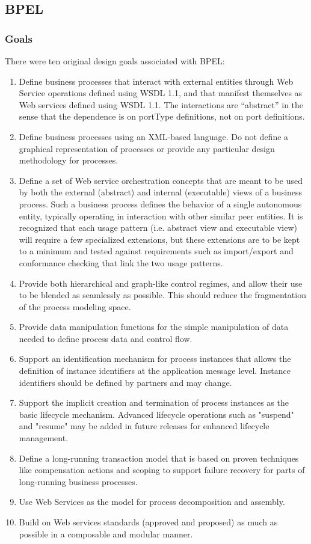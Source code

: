 \documentclass[12pt,a4paper]{article}
\begin{document}
\subsection{BPEL}
\subsubsection{Goals}
There were ten original design goals associated with BPEL:
\begin{enumerate}
\item Define business processes that interact with external entities through Web Service operations defined using WSDL 1.1, and that manifest themselves as Web services defined using WSDL 1.1. The interactions are “abstract” in the sense that the dependence is on portType definitions, not on port definitions.
\item Define business processes using an XML-based language. Do not define a graphical representation of processes or provide any particular design methodology for processes.
\item Define a set of Web service orchestration concepts that are meant to be used by both the external (abstract) and internal (executable) views of a business process. Such a business process defines the behavior of a single autonomous entity, typically operating in interaction with other similar peer entities. It is recognized that each usage pattern (i.e. abstract view and executable view) will require a few specialized extensions, but these extensions are to be kept to a minimum and tested against requirements such as import/export and conformance checking that link the two usage patterns.
\item Provide both hierarchical and graph-like control regimes, and allow their use to be blended as seamlessly as possible. This should reduce the fragmentation of the process modeling space.
\item Provide data manipulation functions for the simple manipulation of data needed to define process data and control flow.
\item Support an identification mechanism for process instances that allows the definition of instance identifiers at the application message level. Instance identifiers should be defined by partners and may change.
\item Support the implicit creation and termination of process instances as the basic lifecycle mechanism. Advanced lifecycle operations such as "suspend" and "resume" may be added in future releases for enhanced lifecycle management.
\item Define a long-running transaction model that is based on proven techniques like compensation actions and scoping to support failure recovery for parts of long-running business processes.
\item Use Web Services as the model for process decomposition and assembly.
\item Build on Web services standards (approved and proposed) as much as possible in a composable and modular manner.

\end{enumerate}
\end{document}
